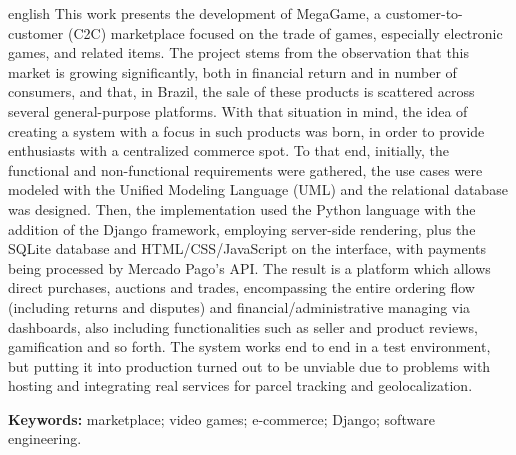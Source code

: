 \documentclass[
  12pt,
  a4paper,
  oneside,
  chapter=TITLE,
  subsection=TITLE,
  sumario=abnt-6027-2012,
  english,
  brazil
]{abntex2}
\begin{document}
\begin{resumo}[Abstract]
\begin{otherlanguage*}{english}
This work presents the development of MegaGame, a customer-to-customer
(C2C) marketplace focused on the trade of games, especially electronic
games, and related items. The project stems from the observation that
this market is growing significantly, both in financial return and in
number of consumers, and that, in Brazil, the sale of these products is
scattered across several general-purpose platforms. With that situation in mind, the
idea of creating a system with a focus in such products was born, in order to provide enthusiasts
with a centralized commerce spot. To that end, initially, the functional and non-functional requirements
were gathered, the use cases were modeled with the Unified Modeling Language (UML)
and the relational database was designed. Then, the implementation used the Python
language with the addition of the Django framework, employing server-side rendering, plus the
SQLite database and HTML/CSS/JavaScript on the interface, with
payments being processed by Mercado Pago's API. The result is a platform which allows
direct purchases, auctions and trades, encompassing the entire ordering flow (including
returns and disputes) and financial/administrative managing via dashboards, also
including functionalities such as seller and product reviews, gamification and so forth. The system 
works end to end in a test environment, but putting it into production turned out to be unviable due
to problems with hosting and integrating real services for parcel tracking and
geolocalization.

\vspace{\onelineskip}
\noindent\textbf{Keywords:} marketplace; video games; e-commerce; Django; software engineering.
\end{otherlanguage*}
\end{resumo}

\listoffigures*
\cleardoublepage
{}
\listoftables*
\cleardoublepage
\end{document}
